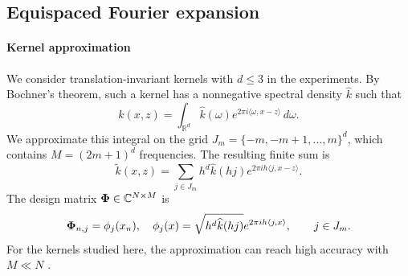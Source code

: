 \subsection{Equispaced Fourier expansion}
\label{subsec:equispaced-fourier-expansion}
\paragraph{Kernel approximation}
\label{subsec:fourier-expansion}

We consider translation-invariant kernels with \(d\leq3\) in the experiments.
By Bochner's theorem, such a kernel has a nonnegative spectral density
\(\widehat k\) such that
\[
k(x,z)
=
\int_{\mathbb R^d}
\widehat k(\omega)
 e^{2\pi i\langle \omega,x-z\rangle}\,d\omega .
\]
We approximate this integral on the grid
\(J_m=\{-m,-m+1,\ldots,m\}^d\), which contains
\(M=(2m+1)^d\) frequencies. The resulting finite sum is
\cite{bochner1933monotone,greengard2025efgp,barnett2024uniform}
\[
\widetilde k(x,z)
=
\sum_{j\in J_m}
 h^d\widehat k(hj)
 e^{2\pi i h\langle j,x-z\rangle}.
\]
The design matrix \(\boldsymbol\Phi\in\mathbb C^{N\times M}\) is
\[
  \boldsymbol\Phi_{n,j}=\phi_j(x_n),\quad \phi_j(x)
=
\sqrt{h^d\widehat k(hj)}
 e^{2\pi i h\langle j,x\rangle},
\qquad j\in J_m .
\]
For the kernels studied here, the approximation can reach high accuracy with
\(M\ll N\) \cite{greengard2025efgp,barnett2024uniform}.



